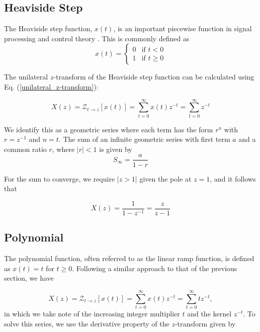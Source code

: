 \documentclass[a4paper]{report}
\begin{document}
\subsection{Heaviside Step}\label{section:heaviside_step}
The Heaviside step function, $x(t)$, is an important piecewise function in signal processing and control theory \citep{proakis2007digital}. This is commonly defined as
\begin{equation}
	x(t) = 
	\begin{cases}
        0 & \text{if } t < 0 \\
        1 & \text{if } t \geq 0
    \end{cases}
\end{equation}

The unilateral $z$-transform of the Heaviside step function can be calculated using Eq. (\ref{unilateral_z-transform}):

\begin{equation}
X(z) = 	\mathcal{Z}_{t \rightarrow z}[x(t)] = \sum^{\infty}_{t = 0}x(t)z^{-t} = \sum^{\infty}_{t=0} z^{-t}
\end{equation}

We identify this as a geometric series where each term has the form $r^n$ with $r = z^{-1}$ and $n = t$. The sum of an infinite geometric series with first term $a$ and a common ratio $r$, where $|r| < 1$ is given by
\begin{equation}\label{equation:geometric_series}
S_\infty = \frac{a}{1-r}	
\end{equation}

For the sum to converge, we require $|z > 1|$ given the pole at $z = 1$, and it follows that

\begin{equation}
X(z) = \frac{1}{1 - z^{-1}} = \frac{z}{z - 1}
\end{equation}

\subsection{Polynomial}
The polynomial function, often referred to as the linear ramp function, is defined as $x(t) = t$ for $t \geq 0	$. Following a similar approach to that of the previous section, we have

\begin{equation}
X(z) = 	\mathcal{Z}_{t \rightarrow z}[x(t)] = \sum^{\infty}_{t = 0}x(t)z^{-t} = \sum^{\infty}_{t=0} tz^{-t},
\end{equation}
in which we take note of the increasing integer multiplier $t$ and the kernel $z^{-t}$. To solve this series, we use the derivative property of the $z$-transform  given by
\end{document}
